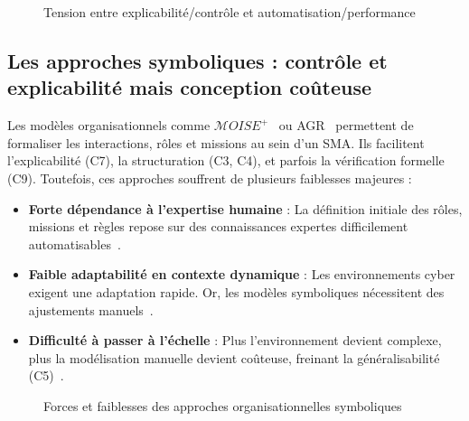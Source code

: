 \documentclass[ twoside,openright,titlepage,numbers=noenddot,headinclude,%
                footinclude=true,cleardoublepage=empty,abstractoff, %
                BCOR=5mm,paper=a4,fontsize=11pt,%
                french,american,%
                ]{scrreprt}
\begin{document}
\begin{figure}[H]
    \centering
    \caption{Tension entre explicabilité/contrôle et automatisation/performance}
    \label{fig:limits_tradeoff}
\end{figure}

\subsection{Les approches symboliques : contrôle et explicabilité mais conception coûteuse}

Les modèles organisationnels comme $\mathcal{M}OISE^+$~\cite{Hubner2002} ou AGR~\cite{Ferber2003} permettent de formaliser les interactions, rôles et missions au sein d'un SMA. Ils facilitent l'explicabilité (C7), la structuration (C3, C4), et parfois la vérification formelle (C9). Toutefois, ces approches souffrent de plusieurs faiblesses majeures :

\begin{itemize}
    \item \textbf{Forte dépendance à l'expertise humaine} : La définition initiale des rôles, missions et règles repose sur des connaissances expertes difficilement automatisables~\cite{Boella2008}.
    \item \textbf{Faible adaptabilité en contexte dynamique} : Les environnements cyber exigent une adaptation rapide. Or, les modèles symboliques nécessitent des ajustements manuels~\cite{Picard2005}.
    \item \textbf{Difficulté à passer à l'échelle} : Plus l'environnement devient complexe, plus la modélisation manuelle devient coûteuse, freinant la généralisabilité (C5)~\cite{Picard2006}.
\end{itemize}

\begin{figure}[H]
    \centering
    \caption{Forces et faiblesses des approches organisationnelles symboliques}
    \label{fig:limits_symbolic}
\end{figure}
\end{document}

